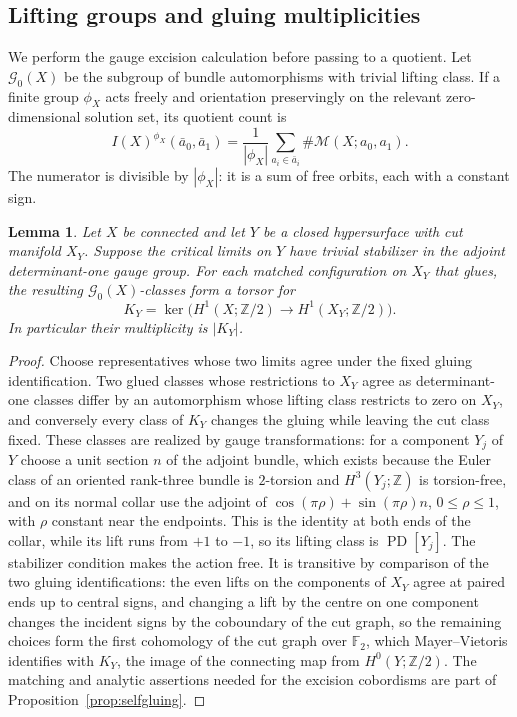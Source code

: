 \documentclass[11pt]{amsart}
\newtheorem{lemma}[theorem]{Lemma}
\theoremstyle{definition}
\theoremstyle{remark}
\theoremstyle{plain}
\numberwithin{equation}{section}
\newcommand{\ZZ}{\mathbb Z}
\newcommand{\FF}{\mathbb F_2}
\newcommand{\PD}{\operatorname{PD}}
\begin{document}
\subsection{Lifting groups and gluing multiplicities}
\label{subsec:lifting-mult}
We perform the gauge excision calculation before passing to a quotient.
Let $\mathcal G_0(X)$ be the subgroup of bundle automorphisms with trivial
lifting class. If a finite group $\phi_X$ acts freely and orientation
preservingly on the relevant zero-dimensional solution set, its quotient
count is
\begin{equation}\label{eq:orbit-count}
 I(X)^{\phi_X}(\bar a_0,\bar a_1)
 =\frac{1}{|\phi_X|}
   \sum_{a_i\in\bar a_i}\#\mathcal M(X;a_0,a_1).
\end{equation}
The numerator is divisible by $|\phi_X|$: it is a sum of free orbits, each
with a constant sign.

\begin{lemma}\label{lem:gluing-multiplicity}
Let $X$ be connected and let $Y$ be a closed hypersurface with cut manifold
$X_Y$. Suppose the critical limits on $Y$ have trivial stabilizer in the
adjoint determinant-one gauge group. For each matched configuration on $X_Y$
that glues, the resulting $\mathcal G_0(X)$-classes form a torsor for
\[
 K_Y=\ker\bigl(H^1(X;\ZZ/2)\longrightarrow H^1(X_Y;\ZZ/2)\bigr).
\]
In particular their multiplicity is $|K_Y|$.
\end{lemma}
\begin{proof}
Choose representatives whose two limits agree under the fixed gluing
identification. Two glued classes whose restrictions to $X_Y$ agree as
determinant-one classes differ by an automorphism whose lifting class
restricts to zero on $X_Y$, and conversely every class of $K_Y$ changes the
gluing while leaving the cut class fixed. These classes are realized by gauge
transformations: for a
component $Y_j$ of $Y$ choose a unit section $n$ of the adjoint bundle,
which exists because the Euler class of an oriented rank-three bundle is
$2$-torsion and $H^3(Y_j;\ZZ)$ is torsion-free, and on its normal collar use
the adjoint of $\cos(\pi\rho)+\sin(\pi\rho)n$, $0\le\rho\le1$, with $\rho$
constant near the endpoints. This is the identity at both ends of the collar,
while its lift runs from $+1$ to $-1$, so its lifting class is $\PD[Y_j]$.
The stabilizer condition makes the action free. It is transitive by comparison
of the two gluing identifications: the even lifts on the components of $X_Y$
agree at paired ends up to central signs, and changing a lift by the centre on
one component changes the incident signs by the coboundary of the cut graph,
so the remaining choices form the first cohomology of the cut graph over
$\FF$, which Mayer--Vietoris identifies with $K_Y$, the image of the
connecting map from $H^0(Y;\ZZ/2)$. The
matching and analytic assertions needed for the excision cobordisms are part
of Proposition~\ref{prop:selfgluing}.
\end{proof}
\end{document}
